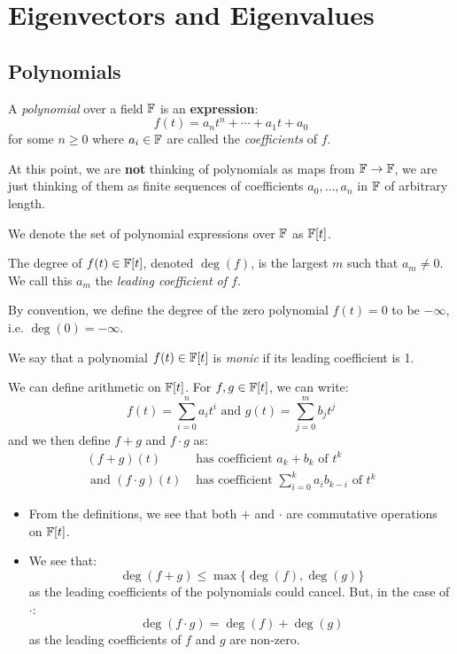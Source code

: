 \documentclass[../main.tex]{subfiles}
\begin{document}
\chapter{Eigenvectors and Eigenvalues}
\section{Polynomials}
\begin{definition} A \textit{polynomial} over a field $\mathbb{F}$ is an \textbf{expression}: \[
    f(t) = a_n t^n + \cdots + a_1 t + a_0
  \]
  for some $n \geq 0$ where $a_i \in \mathbb{F}$ are called the \textit{coefficients} of $f$.
\end{definition}
\begin{remark}
  At this point, we are \textbf{not} thinking of polynomials as maps from $\mathbb{F} \to \mathbb{F}$, we are just thinking of them as finite sequences of coefficients $a_0, \ldots, a_n$ in $\mathbb{F}$ of arbitrary length.
\end{remark}
\begin{remark}[Notation]
  We denote the set of polynomial expressions over $\mathbb{F}$ as $\mathbb{F}[t]$.
\end{remark}
\begin{definition}[Degree]
  The degree of $f(t) \in \mathbb{F}[t]$, denoted $\deg(f)$, is the largest $m$ such that $a_m \neq 0$.
  We call this $a_m$ the \textit{leading coefficient of $f$}.
\end{definition}
\begin{remark}
  By convention, we define the degree of the zero polynomial $f(t) = 0$ to be $-\infty$, i.e. $\deg(0) = -\infty$.
\end{remark}
\begin{definition}[Monic]
  We say that a polynomial $f(t) \in \mathbb{F}[t]$ is \textit{monic} if its leading coefficient is 1.
\end{definition}
We can define arithmetic on $\mathbb{F}[t]$.
For $f, g \in \mathbb{F}[t]$, we can write:
\[
  f(t) = \sum_{i = 0}^{n} a_i t^{i} \text{ and } g(t) = \sum_{j = 0}^{m} b_j t^{j}
\]
and we then define $f + g$ and $f \cdot g$ as:
\begin{align*}
  (f + g)(t) &\text{ has coefficient } a_k + b_k \text{ of $t^k$}\\
  \text{ and } (f \cdot g)(t) &\text{ has coefficient } \sum_{i = 0}^{k} a_i b_{k - i} \text{ of $t^k$}
\end{align*}
\begin{remark}[Remarks]
  \begin{itemize}
    \item From the definitions, we see that both $+$ and $\cdot$ are commutative operations on $\mathbb{F}[t]$.
    \item We see that:
      \[
        \deg(f + g) \leq \max\{\deg(f), \deg(g)\}
      \]
      as the leading coefficients of the polynomials could cancel.
      But, in the case of $\cdot$:
      \begin{equation}
        \deg(f \cdot g) = \deg(f) + \deg(g) \label{polyDeg}
      \end{equation}
      as the leading coefficients of $f$ and $g$ are non-zero.
  \end{itemize}
\end{remark}
\end{document}
